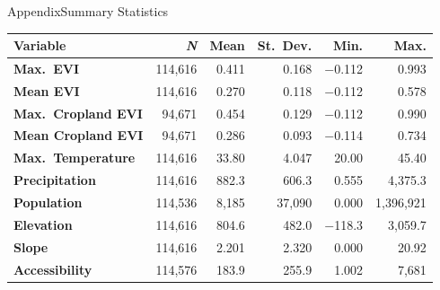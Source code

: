 \documentclass[aspectratio=169,11pt,dvipsnames, handout]{beamer}
\begin{document}
\begin{frame}{\textcolor{defaultclr!30}{Appendix}\hspace{0.75em}Summary Statistics}
\label{frame:sumstats}
    \centering
    \renewcommand{\arraystretch}{1} 
    \begin{tabular}{lrrrrr} 
    \toprule \textbf{Variable} & \textbf{\textit{N}} & \textbf{Mean} & \textbf{St.~Dev.} & \textbf{Min.} & \textbf{Max.} \\ \midrule
    \textbf{Max.~EVI} & 114,616 & 0.411 & 0.168 & $-$0.112 & 0.993 \\ 
    \textbf{Mean EVI} & 114,616 & 0.270 & 0.118 & $-$0.112 & 0.578 \\ 
    \textbf{Max.~Cropland EVI} & 94,671 & 0.454 & 0.129 & $-$0.112 & 0.990 \\ 
    \textbf{Mean Cropland EVI} & 94,671 & 0.286 & 0.093 & $-$0.114 & 0.734 \\ 
    \textbf{Max.~Temperature} & 114,616 & 33.80 & 4.047 & 20.00 & 45.40 \\ 
    \textbf{Precipitation} & 114,616 & 882.3 & 606.3 & 0.555 & 4,375.3 \\ 
    \textbf{Population} & 114,536 & 8,185 & 37,090 & 0.000 & 1,396,921 \\ 
    \textbf{Elevation} & 114,616 & 804.6 & 482.0 & $-$118.3 & 3,059.7 \\ 
    \textbf{Slope} & 114,616 & 2.201 & 2.320 & 0.000 & 20.92 \\ 
    \textbf{Accessibility} & 114,576 & 183.9 & 255.9 & 1.002 & 7,681 \\  \bottomrule
    \end{tabular}
    \renewcommand{\arraystretch}{0.68}

    \vspace{0.5em}
    \hyperlink{frame:covars}{} 
    \hyperlink{frame:covars_balance}{}
\end{frame}


\end{document}
